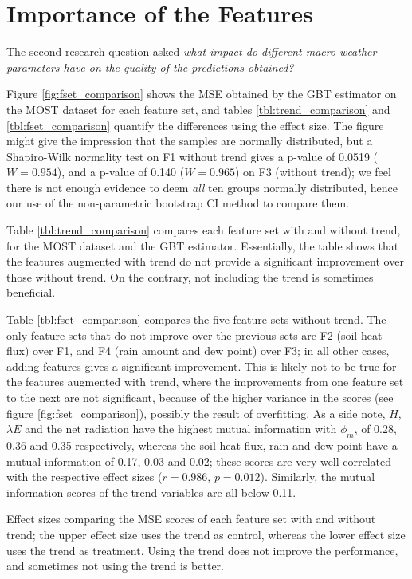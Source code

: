 \documentclass[a4paper,11pt]{kth-mag}
\begin{document}
\section{Importance of the Features}
\label{sec:feat_imps}
The second research question asked \emph{what impact do different macro-weather parameters have on the quality of the predictions obtained?}


Figure \ref{fig:fset_comparison} shows the MSE obtained by the GBT estimator on the MOST dataset for each feature set, and tables \ref{tbl:trend_comparison} and \ref{tbl:fset_comparison} quantify the differences using the effect size. The figure might give the impression that the samples are normally distributed, but a Shapiro-Wilk normality test on F1 without trend gives a p-value of 0.0519 ($W=0.954$), and a p-value of 0.140 ($W=0.965$) on F3 (without trend); we feel there is not enough evidence to deem \emph{all} ten groups normally distributed, hence our use of the non-parametric bootstrap CI method to compare them.

Table \ref{tbl:trend_comparison} compares each feature set with and without trend, for the MOST dataset and the GBT estimator. Essentially, the table shows that the features augmented with trend do not provide a significant improvement over those without trend. On the contrary, not including the trend is sometimes beneficial.

Table \ref{tbl:fset_comparison} compares the five feature sets without trend. The only feature sets that do not improve over the previous sets are F2 (soil heat flux) over F1, and F4 (rain amount and dew point) over F3; in all other cases, adding features gives a significant improvement. This is likely not to be true for the features augmented with trend, where the improvements from one feature set to the next are not significant, because of the higher variance in the scores (see figure \ref{fig:fset_comparison}), possibly the result of overfitting. As a side note, $H$, $\lambda E$ and the net radiation have the highest mutual information with $\phi_m$, of 0.28, 0.36 and 0.35 respectively, whereas the soil heat flux, rain and dew point have a mutual information of 0.17, 0.03 and 0.02; these scores are very well correlated with the respective effect sizes ($r=0.986$, $p=0.012$). Similarly, the mutual information scores of the trend variables are all below 0.11.

\begin{table}
\caption{Effect sizes comparing the MSE scores of each feature set with and without trend; the upper effect size uses the trend as control, whereas the lower effect size uses the trend as treatment. Using the trend does not improve the performance, and sometimes not using the trend is better.}
\label{tbl:trend_comparison}

\end{table}
\end{document}
